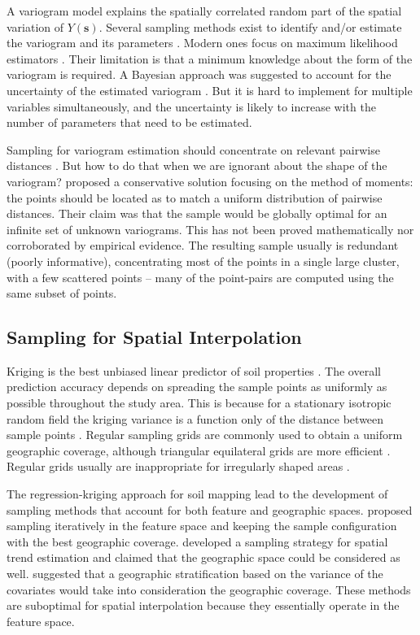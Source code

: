 A variogram model explains the spatially correlated random part of the spatial variation of 
$Y(\boldsymbol{s})$. Several sampling methods exist to identify and/or estimate the variogram and its 
parameters \cite{BrusEtAl1994, deGruijterEtAl2006, Mueller2007, WebsterEtAl2013}. Modern ones focus on maximum 
likelihood estimators \cite{Lark2002, Zimmerman2006, Mueller2007}. Their limitation is that a minimum knowledge 
about the form of the variogram is required. A Bayesian approach was suggested to account for the uncertainty 
of the estimated variogram \cite{DiggleEtAl2006, MarchantEtAl2006, ZhuEtAl2006}. But it is hard to implement 
for multiple variables simultaneously, and the uncertainty is likely to increase with the number of parameters 
that need to be estimated.

Sampling for variogram estimation should concentrate on relevant pairwise distances \cite{MuellerEtAl1999, 
Lark2002}. But how to do that when we are ignorant about the shape of the variogram? \citet{BreslerEtAl1982, 
Russo1984, WarrickEtAl1987} proposed a conservative solution focusing on the method of moments: the points 
should be located as to match a uniform distribution of pairwise distances. Their claim was that the sample 
would be globally optimal for an infinite set of unknown variograms. This has not been proved mathematically 
nor corroborated by empirical evidence. The resulting sample usually is redundant (poorly informative), 
concentrating most of the points in a single large cluster, with a few scattered points -- many of the 
point-pairs are computed using the same subset of points.

\subsection{Sampling for Spatial Interpolation}

Kriging is the best unbiased linear predictor of soil properties \cite{LarkEtAl2006}. The overall prediction 
accuracy depends on spreading the sample points as uniformly as possible throughout the study area. This is 
because for a stationary isotropic random field the kriging variance is a function only of the distance between 
sample points \cite{Cressie1993}. Regular sampling grids are commonly used to obtain a uniform geographic 
coverage, although triangular equilateral grids are more efficient \cite{WebsterEtAl2007}. Regular grids 
usually are inappropriate for irregularly shaped areas \cite{WalvoortEtAl2010}.

The regression-kriging approach for soil mapping \cite{HenglEtAl2007b} lead to the development of sampling 
methods that account for both feature and geographic spaces. \citet{HenglEtAl2003a} proposed sampling 
iteratively in the feature space and keeping the sample configuration with the best geographic coverage. 
\citet{MinasnyEtAl2006b} developed a sampling strategy for spatial trend estimation and claimed that the 
geographic space could be considered as well. \citet{MinasnyEtAl2007a} suggested that a geographic 
stratification based on the variance of the covariates would take into consideration the geographic coverage. 
These methods are suboptimal for spatial interpolation because they essentially operate in the feature space.

